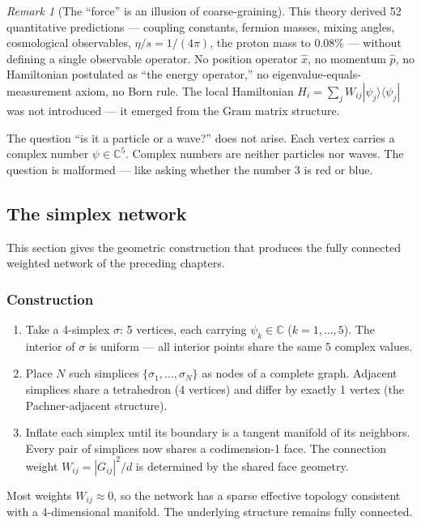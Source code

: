 \documentclass[12pt]{article}
\theoremstyle{remark}
\newtheorem{remark}[theorem]{Remark}
\theoremstyle{definition}
\newcommand{\CC}{\mathbb{C}}
\begin{document}
\begin{remark}[The ``force'' is an illusion of coarse-graining]
This theory derived 52 quantitative predictions --- coupling constants, fermion masses, mixing angles, cosmological observables, $\eta/s = 1/(4\pi)$, the proton mass to 0.08\% --- without defining a single observable operator. No position operator $\hat{x}$, no momentum $\hat{p}$, no Hamiltonian postulated as ``the energy operator,'' no eigenvalue-equals-measurement axiom, no Born rule. The local Hamiltonian $H_i = \sum_j W_{ij}|\psi_j\rangle\langle\psi_j|$ was not introduced --- it emerged from the Gram matrix structure.

The question ``is it a particle or a wave?'' does not arise. Each vertex carries a complex number $\psi \in \CC^5$. Complex numbers are neither particles nor waves. The question is malformed --- like asking whether the number 3 is red or blue.

\subsection{The simplex network}

This section gives the geometric construction that produces the fully connected weighted network of the preceding chapters.

\subsubsection{Construction}

\begin{enumerate}
\item Take a 4-simplex $\sigma$: 5 vertices, each carrying $\psi_k \in \CC$ ($k = 1, \ldots, 5$). The interior of $\sigma$ is uniform --- all interior points share the same 5 complex values.

\item Place $N$ such simplices $\{\sigma_1, \ldots, \sigma_N\}$ as nodes of a complete graph. Adjacent simplices share a tetrahedron (4 vertices) and differ by exactly 1 vertex (the Pachner-adjacent structure).

\item Inflate each simplex until its boundary is a tangent manifold of its neighbors. Every pair of simplices now shares a codimension-1 face. The connection weight $W_{ij} = |G_{ij}|^2/d$ is determined by the shared face geometry.
\end{enumerate}

Most weights $W_{ij} \approx 0$, so the network has a sparse effective topology consistent with a 4-dimensional manifold. The underlying structure remains fully connected.


\end{remark}
\end{document}
